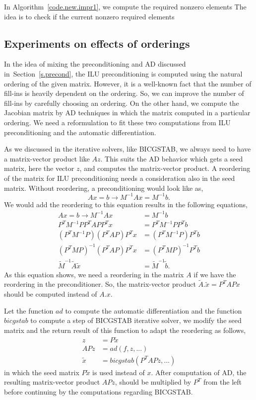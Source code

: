 \documentclass[12pt, twoside,a4paper,toc=bibliography]{scrbook}
\newcommand{\secref}[1]{Section~\protect\ref{#1}}
\newcommand{\coderef}[1]{Algorithm~\protect\ref{#1}}
\begin{document}
In \coderef{code.new.impr1}, we compute the required nonzero elements
The idea is to check if the current nonzero required elements

\subsection{Experiments on effects of orderings}
\label{s.ilu}
In the idea of mixing the preconditioning and AD discussed in~\secref{s.precond},
the ILU preconditioning is computed using the natural ordering of the given matrix. However,
it is a well-known fact that the number of fill-ins is heavily dependent on the ordering.
So, we can improve the number of fill-ins by carefully choosing an ordering.
On the other hand, we compute the Jacobian matrix by AD techniques in which
the matrix computed in a particular ordering. We need a reformulation to
fit these two computations from ILU preconditioning and the automatic differentiation.

As we discussed in the iterative solvers, like BICGSTAB,
we always need to have a matrix-vector product like $Az$.
This suits the AD behavior which gets a seed matrix, here the vector $z$, and
computes the matrix-vector product.
A reordering of the matrix for ILU preconditioning
needs a consideration also in the seed matrix.
Without reordering, a preconditioning would look like as,
$$
Ax = b \rightarrow M^{-1} Ax = M^{-1}b.
$$
We would add the reordering to this equation results in the following equations,
\begin{align*}
Ax = b \rightarrow M^{-1} Ax &= M^{-1}b\\
P^T M^{-1} P P^T A P P^T x &= P^T M^{-1} P P^T b\\
(P^T M^{-1} P) (P^T A P) P^T x &= (P^T M^{-1} P) P^T b\\
(P^T M P)^{-1} (P^T A P) P^T x &= (P^T M P)^{-1} P^T b\\
\tilde{M}^{-1}\tilde{A}\tilde{x} &= \tilde{M}^{-1}\tilde{b}.
\end{align*}
As this equation shows, we need a reordering in the matrix $A$ if we
have the reordering in the preconditioner.
So, the matrix-vector product $\tilde{A}.\tilde{x} = P^T A P x$
should be computed instead of $A.x$.

Let the function $ad$ to compute the automatic differentiation
and the function $bicgstab$ to compute a step of BICGSTAB iterative solver,
we modify the seed matrix and the return result of this function
to adapt the reordering as follows,
\begin{align*}
z &= P \tilde{x}\\
APz &= ad(f,z,...)\\
\tilde{x} &= bicgstab(P^T APz,...)
\end{align*}
in which the seed matrix $P \tilde{x}$ is used instead of $x$.
After computation of AD, the resulting matrix-vector product $APz$,
should be multiplied by $P^T$ from the left before continuing by the
computations regarding BICGSTAB.
\end{document}
